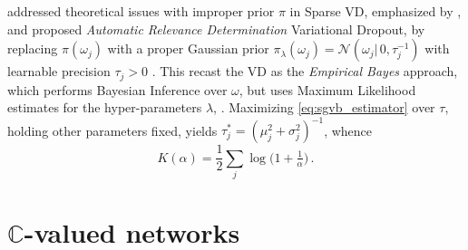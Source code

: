 \documentclass[a4paper,10pt,twocolumn]{article}
\newcommand{\cplx}{\mathbb{C}}
\begin{document}
\citet{kharitonov_variational_2018} addressed theoretical issues with improper prior
$\pi$ in Sparse VD, emphasized by \citet{hron_variational_2018}, and proposed
\emph{Automatic Relevance Determination} Variational Dropout, by replacing $\pi(\omega_j)$
with a proper Gaussian prior $
  \pi_\lambda(\omega_j) = \mathcal{N}(\omega_j \vert\, 0, \tau_j^{-1})
$ with learnable precision $\tau_j > 0$ \citep{neal_bayesian_1996}. This recast the VD
as the \emph{Empirical Bayes} approach, which performs Bayesian Inference over $\omega$,
but uses Maximum Likelihood estimates for the hyper-parameters $\lambda$,
\citep{mackay_bayesian_1994}. Maximizing \eqref{eq:sgvb_estimator} over $\tau$, holding
other parameters fixed, yields $
  \tau^*_j = {(\mu_j^2 + \sigma^2_j)}^{-1}
$, whence
\begin{equation}  \label{eq:ard-kl-div-real}
  K(\alpha)
    = \frac12 \sum_j \log{\bigl(1 + \tfrac1{\alpha} \bigr)}
    \,.
\end{equation}





\section{$\cplx$-valued networks} %
\label{sec:c_valued_networks}
\end{document}
